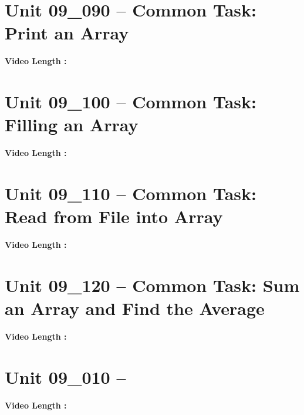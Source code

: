 \documentclass[letterpaper,12pt]{exam}
\newcommand{\unit}{Unit 09}
\begin{document}
\section*{\unit\_090 -- Common Task: Print an Array} 
\par{\selectfont\textbf{Video Length :}}

\section*{\unit\_100 -- Common Task: Filling an Array} 
\par{\selectfont\textbf{Video Length :}}
\section*{\unit\_110 -- Common Task: Read from File into Array} 
\par{\selectfont\textbf{Video Length :}}
\section*{\unit\_120 -- Common Task: Sum an Array and Find the Average} 
\par{\selectfont\textbf{Video Length :}}
\section*{\unit\_010 -- } 
\par{\selectfont\textbf{Video Length :}}
\end{document}
